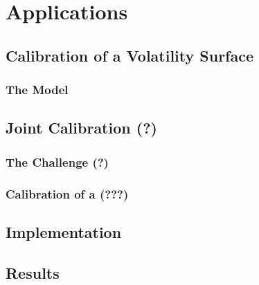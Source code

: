\chapter{Applications} \label{ch:cap6} 

\section{Calibration of a Volatility Surface}
\subsection{The Model}

\section{Joint Calibration (?)}
\subsection{The Challenge (?)}

\subsection{Calibration of a (???)}

\section{Implementation}

\section{Results}
